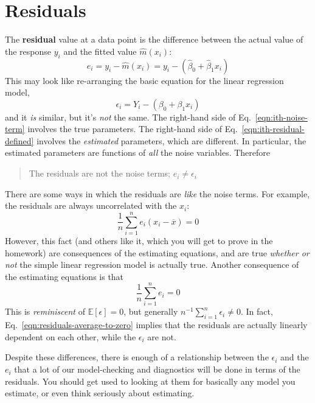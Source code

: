 \documentclass{article}
\newcommand{\Expect}[1]{\mathbb{E}\left[ #1 \right]}
\begin{document}
\section{Residuals}

The {\bf residual} value at a data point is the difference between
the actual value of the response $y_i$ and the fitted value $\hat{m}(x_i)$:
\begin{equation}
\label{eqn:ith-residual-defined}
e_i = y_i - \hat{m}(x_i) = y_i - (\hat{\beta}_0 + \hat{\beta}_1 x_i)
\end{equation}
This may look like re-arranging the basic equation for the
linear regression model,
\begin{equation}
\label{eqn:ith-noise-term}
\epsilon_i = Y_i - (\beta_0 + \beta_1 x_i)
\end{equation}
and it {\em is} similar, but it's {\em not} the same.  The right-hand
side of Eq.\ \ref{eqn:ith-noise-term} involves the true parameters.
The right-hand side of Eq.\ \ref{eqn:ith-residual-defined} involves the
{\em estimated} parameters, which are different.  In particular, the estimated
parameters are functions of {\em all} the noise variables.  Therefore
\begin{quotation}
The residuals are not the noise terms;  $e_i \neq \epsilon_i$
\end{quotation}

There are some ways in which the residuals are {\em like} the noise terms.
For example, the residuals are always uncorrelated with the $x_i$:
\begin{equation}
\frac{1}{n}\sum_{i=1}^{n}{e_i (x_i - \overline{x})} = 0
\end{equation}
However, this fact (and others like it, which you will get to prove in the
homework) are consequences of the estimating equations, and are true {\em
  whether or not} the simple linear regression model is actually true.  Another
consequence of the estimating equations is that
\begin{equation}
\label{eqn:residuals-average-to-zero}
\frac{1}{n}\sum_{i=1}^{n}{e_i} = 0
\end{equation}
This is {\em reminiscent} of $\Expect{\epsilon} = 0$, but generally
$n^{-1}\sum_{i=1}^{n}{\epsilon_i} \neq 0$.  In fact, Eq.\
\ref{eqn:residuals-average-to-zero} implies that the residuals are actually
linearly dependent on each other, while the $\epsilon_i$ are not.

Despite these differences, there is enough of a relationship between
the $\epsilon_i$ and the $e_i$ that a lot of our model-checking and
diagnostics will be done in terms of the residuals.  You should get used to
looking at them for basically any model you estimate, or even think
seriously about estimating.
\end{document}
